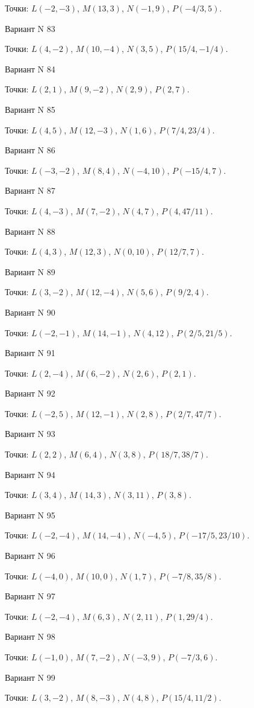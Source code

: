 \documentclass[11pt]{report}
\begin{document}
Точки: $L(-2, -3)$, $M(13, 3)$, $N(-1, 9)$, $P(-4/3, 5)$.

Вариант N 83

Точки: $L(4, -2)$, $M(10, -4)$, $N(3, 5)$, $P(15/4, -1/4)$.

Вариант N 84

Точки: $L(2, 1)$, $M(9, -2)$, $N(2, 9)$, $P(2, 7)$.

Вариант N 85

Точки: $L(4, 5)$, $M(12, -3)$, $N(1, 6)$, $P(7/4, 23/4)$.

Вариант N 86

Точки: $L(-3, -2)$, $M(8, 4)$, $N(-4, 10)$, $P(-15/4, 7)$.

Вариант N 87

Точки: $L(4, -3)$, $M(7, -2)$, $N(4, 7)$, $P(4, 47/11)$.

Вариант N 88

Точки: $L(4, 3)$, $M(12, 3)$, $N(0, 10)$, $P(12/7, 7)$.

Вариант N 89

Точки: $L(3, -2)$, $M(12, -4)$, $N(5, 6)$, $P(9/2, 4)$.

Вариант N 90

Точки: $L(-2, -1)$, $M(14, -1)$, $N(4, 12)$, $P(2/5, 21/5)$.

Вариант N 91

Точки: $L(2, -4)$, $M(6, -2)$, $N(2, 6)$, $P(2, 1)$.

Вариант N 92

Точки: $L(-2, 5)$, $M(12, -1)$, $N(2, 8)$, $P(2/7, 47/7)$.

Вариант N 93

Точки: $L(2, 2)$, $M(6, 4)$, $N(3, 8)$, $P(18/7, 38/7)$.

Вариант N 94

Точки: $L(3, 4)$, $M(14, 3)$, $N(3, 11)$, $P(3, 8)$.

Вариант N 95

Точки: $L(-2, -4)$, $M(14, -4)$, $N(-4, 5)$, $P(-17/5, 23/10)$.

Вариант N 96

Точки: $L(-4, 0)$, $M(10, 0)$, $N(1, 7)$, $P(-7/8, 35/8)$.

Вариант N 97

Точки: $L(-2, -4)$, $M(6, 3)$, $N(2, 11)$, $P(1, 29/4)$.

Вариант N 98

Точки: $L(-1, 0)$, $M(7, -2)$, $N(-3, 9)$, $P(-7/3, 6)$.

Вариант N 99

Точки: $L(3, -2)$, $M(8, -3)$, $N(4, 8)$, $P(15/4, 11/2)$.
\end{document}
